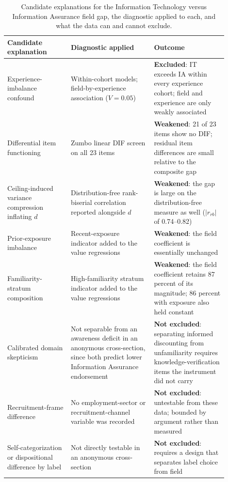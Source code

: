 \begin{table}[htbp]
  \centering
  \caption{Candidate explanations for the Information Technology versus Information Assurance field gap, the diagnostic applied to each, and what the data can and cannot exclude.}
  \label{tab:threats}
  \small
  \begin{tabular}{@{}p{0.26\linewidth}p{0.34\linewidth}p{0.30\linewidth}@{}}
    \toprule
    \textbf{Candidate explanation} & \textbf{Diagnostic applied} & \textbf{Outcome} \\
    \midrule
    Experience-imbalance confound & Within-cohort models; field-by-experience association ($V=0.05$) & \textbf{Excluded}: IT exceeds IA within every experience cohort; field and experience are only weakly associated \\
    \addlinespace
    Differential item functioning & Zumbo linear DIF screen on all 23 items & \textbf{Weakened}: 21 of 23 items show no DIF; residual item differences are small relative to the composite gap \\
    \addlinespace
    Ceiling-induced variance compression inflating $d$ & Distribution-free rank-biserial correlation reported alongside $d$ & \textbf{Weakened}: the gap is large on the distribution-free measure as well ($|r_{rb}|$ of 0.74--0.82) \\
    \addlinespace
    Prior-exposure imbalance & Recent-exposure indicator added to the value regressions & \textbf{Weakened}: the field coefficient is essentially unchanged \\
    \addlinespace
    Familiarity-stratum composition & High-familiarity stratum indicator added to the value regressions & \textbf{Weakened}: the field coefficient retains 87 percent of its magnitude; 86 percent with exposure also held constant \\
    \addlinespace
    Calibrated domain skepticism & Not separable from an awareness deficit in an anonymous cross-section, since both predict lower Information Assurance endorsement & \textbf{Not excluded}: separating informed discounting from unfamiliarity requires knowledge-verification items the instrument did not carry \\
    \addlinespace
    Recruitment-frame difference & No employment-sector or recruitment-channel variable was recorded & \textbf{Not excluded}: untestable from these data; bounded by argument rather than measured \\
    \addlinespace
    Self-categorization or dispositional difference by label & Not directly testable in an anonymous cross-section & \textbf{Not excluded}: requires a design that separates label choice from field \\
    \bottomrule
  \end{tabular}
\end{table}

